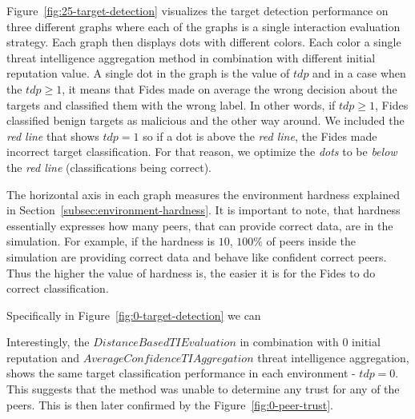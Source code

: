 Figure~\ref{fig:25-target-detection} visualizes the target detection performance on three different graphs where each of the graphs is a single interaction evaluation strategy.
Each graph then displays dots with different colors. Each color a single threat intelligence aggregation method in combination with different initial reputation value.
A single dot in the graph is the value of $tdp$ and in a case when the $tdp \geq 1$, it means that Fides made on average the wrong decision about the targets and classified them with the wrong label.
In other words, if $tdp \geq 1$, Fides classified benign targets as malicious and the other way around.
We included the \textit{red line} that shows $tdp = 1$ so if a dot is above the \textit{red line}, the Fides made incorrect target classification.
For that reason, we optimize the \textit{dots} to be \textit{below} the \textit{red line} (classifications being correct).

The horizontal axis in each graph measures the environment hardness explained in Section~\ref{subsec:environment-hardness}. It is important to note, that hardness essentially expresses how many peers, that can provide correct data, are in the simulation. For example, if the hardness is $10$, $100\%$ of peers inside the simulation are providing correct data and behave like confident correct peers.
Thus the higher the value of hardness is, the easier it is for the Fides to do correct classification.

Specifically in Figure~\ref{fig:0-target-detection} we can 


Interestingly, the $DistanceBasedTIEvaluation$ in combination with $0$ initial reputation and $AverageConfidenceTIAggregation$ threat intelligence aggregation, shows the same target classification performance in each environment - $tdp = 0$. This suggests that the method was unable to determine any trust for any of the peers. This is then later confirmed by the Figure~\ref{fig:0-peer-trust}.

